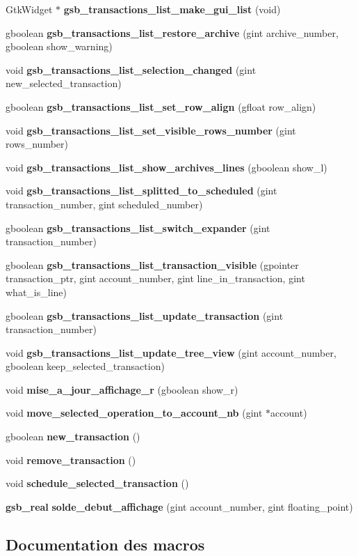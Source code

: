\begin{DoxyCompactItemize}
GtkWidget $\ast$ {\bf gsb\_\-transactions\_\-list\_\-make\_\-gui\_\-list} (void)
\item 
gboolean {\bf gsb\_\-transactions\_\-list\_\-restore\_\-archive} (gint archive\_\-number, gboolean show\_\-warning)
\item 
void {\bf gsb\_\-transactions\_\-list\_\-selection\_\-changed} (gint new\_\-selected\_\-transaction)
\item 
gboolean {\bf gsb\_\-transactions\_\-list\_\-set\_\-row\_\-align} (gfloat row\_\-align)
\item 
void {\bf gsb\_\-transactions\_\-list\_\-set\_\-visible\_\-rows\_\-number} (gint rows\_\-number)
\item 
void {\bf gsb\_\-transactions\_\-list\_\-show\_\-archives\_\-lines} (gboolean show\_\-l)
\item 
void {\bf gsb\_\-transactions\_\-list\_\-splitted\_\-to\_\-scheduled} (gint transaction\_\-number, gint scheduled\_\-number)
\item 
gboolean {\bf gsb\_\-transactions\_\-list\_\-switch\_\-expander} (gint transaction\_\-number)
\item 
gboolean {\bf gsb\_\-transactions\_\-list\_\-transaction\_\-visible} (gpointer transaction\_\-ptr, gint account\_\-number, gint line\_\-in\_\-transaction, gint what\_\-is\_\-line)
\item 
gboolean {\bf gsb\_\-transactions\_\-list\_\-update\_\-transaction} (gint transaction\_\-number)
\item 
void {\bf gsb\_\-transactions\_\-list\_\-update\_\-tree\_\-view} (gint account\_\-number, gboolean keep\_\-selected\_\-transaction)
\item 
void {\bf mise\_\-a\_\-jour\_\-affichage\_\-r} (gboolean show\_\-r)
\item 
void {\bf move\_\-selected\_\-operation\_\-to\_\-account\_\-nb} (gint $\ast$account)
\item 
gboolean {\bf new\_\-transaction} ()
\item 
void {\bf remove\_\-transaction} ()
\item 
void {\bf schedule\_\-selected\_\-transaction} ()
\item 
{\bf gsb\_\-real} {\bf solde\_\-debut\_\-affichage} (gint account\_\-number, gint floating\_\-point)
\end{DoxyCompactItemize}


\subsection{Documentation des macros}
